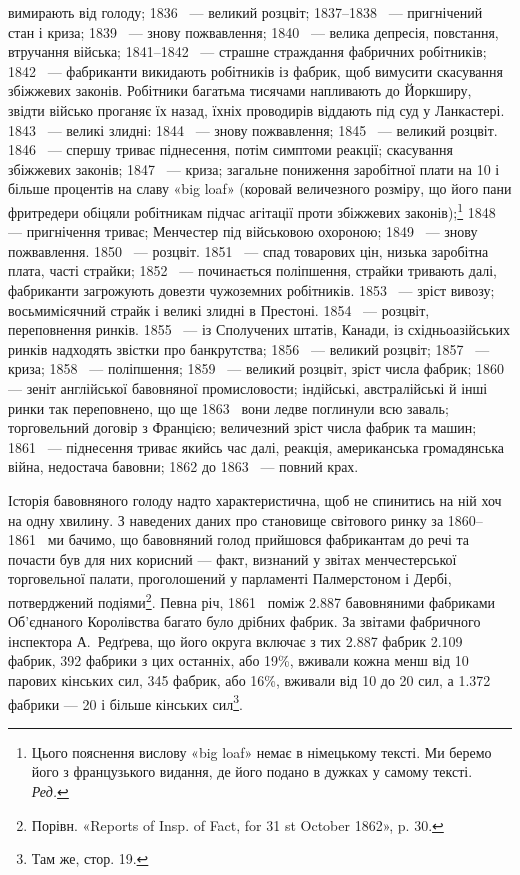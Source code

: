 \parcont{}  %
вимирають від голоду; 1836~ — великий розцвіт; 1837--1838~ —
пригнічений стан і криза; 1839~ — знову пожвавлення; 1840~ —
велика депресія, повстання, втручання війська; 1841--1842~ —
страшне страждання фабричних робітників; 1842~ — фабриканти
викидають робітників із фабрик, щоб вимусити скасування збіжжевих
законів. Робітники багатьма тисячами напливають до
Йоркширу, звідти військо проганяє їх назад, їхніх проводирів
віддають під суд у Ланкастері. 1843~ — великі злидні: 1844~ —
знову пожвавлення; 1845~ — великий розцвіт. 1846~ — спершу
триває піднесення, потім симптоми реакції; скасування збіжжевих
законів; 1847~ — криза; загальне пониження заробітної плати
на 10 і більше процентів на славу «big loaf» (коровай величезного
розміру, що його пани фритредери обіцяли робітникам підчас
агітації проти збіжжевих законів);\footnote*{
Цього пояснення вислову «big loaf» немає в німецькому тексті.
Ми беремо його з французького видання, де його подано в дужках у самому
тексті. \emph{Ред.}
} 1848~ — пригнічення триває; Менчестер під військовою охороною; 1849~ —
знову пожвавлення. 1850~ — розцвіт. 1851~ — спад товарових цін, низька
заробітна плата, часті страйки; 1852~ — починається поліпшення,
страйки тривають далі, фабриканти загрожують довезти чужоземних
робітників. 1853~ — зріст вивозу; восьмимісячний страйк
і великі злидні в Престоні. 1854~ — розцвіт, переповнення ринків.
1855~ — із Сполучених штатів, Канади, із східньоазійських
ринків надходять звістки про банкрутства; 1856~ — великий
розцвіт; 1857~ — криза; 1858~ — поліпшення; 1859~ — великий
розцвіт, зріст числа фабрик; 1860~ — зеніт англійської
бавовняної промисловости; індійські, австралійські й інші ринки
так переповнено, що ще 1863~ вони ледве поглинули всю заваль;
торговельний договір з Францією; величезний зріст числа фабрик
та машин; 1861~ — піднесення триває якийсь час далі, реакція,
американська громадянська війна, недостача бавовни; 1862 до
1863~ — повний крах.

Історія бавовняного голоду надто характеристична, щоб не
спинитись на ній хоч на одну хвилину. З наведених даних про
становище світового ринку за 1860--1861~ ми бачимо, що
бавовняний голод прийшовся фабрикантам до речі та почасти був
для них корисний — факт, визнаний у звітах менчестерської
торговельної палати, проголошений у парламенті Палмерстоном
і Дербі, потверджений подіями\footnote{
Порівн. «Reports of Insp. of Fact, for 31 st October 1862», p. 30.
}. Певна річ, 1861~
поміж \num{2.887} бавовняними фабриками Об’єднаного Королівства
багато було дрібних фабрик. За звітами фабричного інспектора
А.~Редґрева, що його округа включає з тих \num{2.887} фабрик \num{2.109} фабрик,
392 фабрики з цих останніх, або 19\%, вживали кожна
менш від 10 парових кінських сил, 345 фабрик, або 16\%, вживали
від 10 до 20 сил, а \num{1.372} фабрики — 20 і більше кінських сил\footnote{
Там же, стор. 19.
}.
\parbreak{}  %
